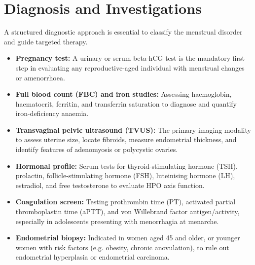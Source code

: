 \section*{Diagnosis and Investigations}
A structured diagnostic approach is essential to classify the menstrual disorder and guide targeted therapy.
\begin{itemize}
    \item \textbf{Pregnancy test:} A urinary or serum beta-hCG test is the mandatory first step in evaluating any reproductive-aged individual with menstrual changes or amenorrhoea.
    \item \textbf{Full blood count (FBC) and iron studies:} Assessing haemoglobin, haematocrit, ferritin, and transferrin saturation to diagnose and quantify iron-deficiency anaemia.
    \item \textbf{Transvaginal pelvic ultrasound (TVUS):} The primary imaging modality to assess uterine size, locate fibroids, measure endometrial thickness, and identify features of adenomyosis or polycystic ovaries.
    \item \textbf{Hormonal profile:} Serum tests for thyroid-stimulating hormone (TSH), prolactin, follicle-stimulating hormone (FSH), luteinising hormone (LH), estradiol, and free testosterone to evaluate HPO axis function.
    \item \textbf{Coagulation screen:} Testing prothrombin time (PT), activated partial thromboplastin time (aPTT), and von Willebrand factor antigen/activity, especially in adolescents presenting with menorrhagia at menarche.
    \item \textbf{Endometrial biopsy:} Indicated in women aged 45 and older, or younger women with risk factors (e.g. obesity, chronic anovulation), to rule out endometrial hyperplasia or endometrial carcinoma.
\end{itemize}

